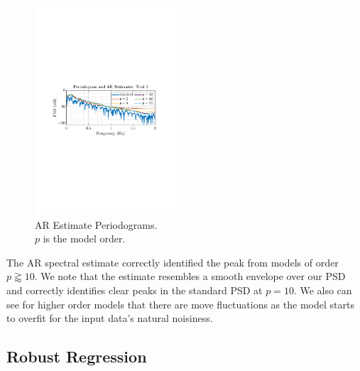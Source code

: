 \documentclass[12pt]{article}
\begin{document}
\begin{figure}
\begin{centering}
		\end{centering}
		\begin{centering}
			\includegraphics[trim={2.2cm 11.2cm 3.15cm  11.2cm}, clip, width=0.49\textwidth]{../MATLAB/figures/q1_5c_fig03.pdf} 
		\end{centering}
		\captionsetup{justification=centering}
		\caption{AR Estimate Periodograms. \\ $p$ is the model order.}
		\label{fig: 1-5c}
	\end{figure}
		The AR spectral estimate correctly identified the peak from models of order $p\gtrapprox10$. We note that the estimate resembles a smooth envelope over our PSD and correctly identifies clear peaks in the standard PSD at $p=10$. We also can see for higher order models that there are move fluctuations as the model starts to overfit for the input data's natural noisiness. \\
		
	\pagebreak
	
	\subsection{Robust Regression} \label{sec: 1-6-robust-regression}
 
\end{document}
